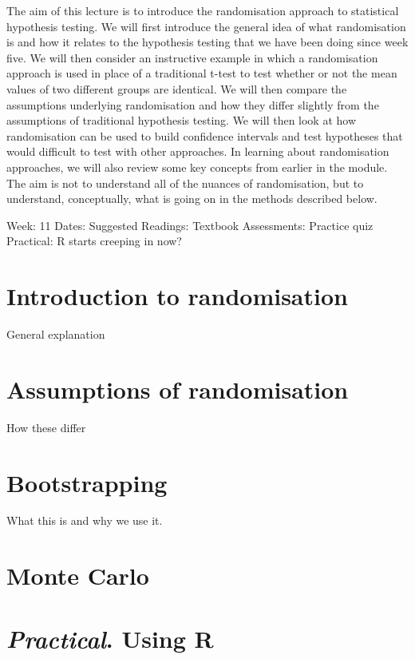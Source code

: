 \documentclass[
]{book}
\begin{document}
The aim of this lecture is to introduce the randomisation approach to statistical hypothesis testing. We will first introduce the general idea of what randomisation is and how it relates to the hypothesis testing that we have been doing since week five. We will then consider an instructive example in which a randomisation approach is used in place of a traditional t-test to test whether or not the mean values of two different groups are identical. We will then compare the assumptions underlying randomisation and how they differ slightly from the assumptions of traditional hypothesis testing. We will then look at how randomisation can be used to build confidence intervals and test hypotheses that would difficult to test with other approaches. In learning about randomisation approaches, we will also review some key concepts from earlier in the module. The aim is not to understand all of the nuances of randomisation, but to understand, conceptually, what is going on in the methods described below.

Week: 11
Dates:
Suggested Readings: Textbook
Assessments: Practice quiz
Practical: R starts creeping in now?

\hypertarget{introduction-to-randomisation}{%
\chapter{Introduction to randomisation}\label{introduction-to-randomisation}}

General explanation

\hypertarget{assumptions-of-randomisation}{%
\chapter{Assumptions of randomisation}\label{assumptions-of-randomisation}}

How these differ

\hypertarget{bootstrapping}{%
\chapter{Bootstrapping}\label{bootstrapping}}

What this is and why we use it.

\hypertarget{monte-carlo}{%
\chapter{Monte Carlo}\label{monte-carlo}}

\hypertarget{practical.-using-r}{%
\chapter{\texorpdfstring{\emph{Practical}. Using R}{Practical. Using R}}\label{practical.-using-r}}
\end{document}
